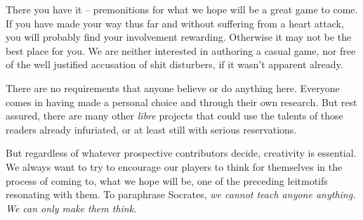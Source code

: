 There you have it -- premonitions for what we hope will be a great game to come. If you have made your way thus far and without suffering from a heart attack, you will probably find your involvement rewarding. Otherwise it may not be the best place for you. We are neither interested in authoring a casual game, nor free of the well justified accusation of shit disturbers, if it wasn't apparent already.

There are no requirements that anyone believe or do anything here. Everyone comes in having made a personal choice and through their own research. But rest assured, there are many other {\it libre} projects that could use the talents of those readers already infuriated, or at least still with serious reservations.

But regardless of whatever prospective contributors decide, creativity is essential. We always want to try to encourage our players to think for themselves in the process of coming to, what we hope will be, one of the preceding leitmotifs resonating with them. To paraphrase Socrates, {\it we cannot teach anyone anything. We can only make them think}.

\StopChapter

